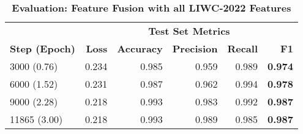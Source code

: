 \begin{table}[H]
\centering
\small
\caption[Evaluation: Feature Fusion with all LIWC-2022 Features]{\textbf{Evaluation: Feature Fusion with all LIWC-2022 Features}}
\label{tab:fusion_all}
\begin{tabular}{@{}lrrrrr@{}} %
\toprule
& \multicolumn{5}{c}{\textbf{Test Set Metrics}} \\
\cmidrule(lr){2-6}
\textbf{Step (Epoch)} & \textbf{Loss} & \textbf{Accuracy} & \textbf{Precision} & \textbf{Recall} & \textbf{F1} \\
\midrule
3000 (0.76)  & 0.234 & 0.985 & 0.959 & 0.989 & \textbf{0.974} \\
6000 (1.52)  & 0.231 & 0.987 & 0.962 & 0.994 & \textbf{0.978} \\
9000 (2.28)  & 0.218 & 0.993 & 0.983 & 0.992 & \textbf{0.987} \\
11865 (3.00) & 0.218 & 0.993 & 0.989 & 0.985 & \textbf{0.987} \\
\bottomrule
\end{tabular}
\end{table}

